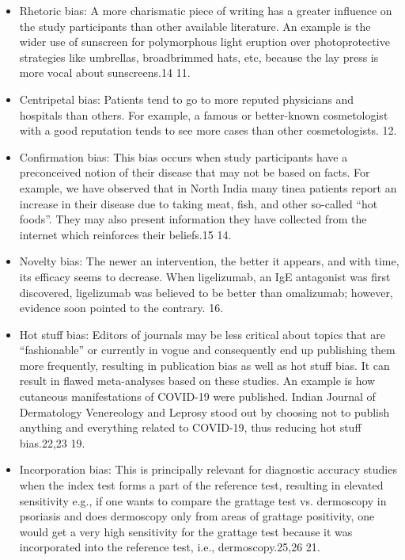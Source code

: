 \documentclass[12pt, a4paper, oneside]{book}   	%
\begin{document}
\begin{itemize}
				\item Rhetoric bias: A more charismatic piece of writing has a greater influence on the study participants than other available literature. An example is the wider use of sunscreen for polymorphous light eruption over photoprotective strategies like umbrellas, broadbrimmed hats, etc, because the lay press is more vocal about sunscreens.14 11. \autocite{Chakraborty_2023}
				\item Centripetal bias: Patients tend to go to more reputed physicians and hospitals than others. For example, a famous or better-known cosmetologist with a good reputation tends to see more cases than other cosmetologists. 12.\autocite{Chakraborty_2023}
				\item  Confirmation bias: This bias occurs when study participants have a preconceived notion of their disease that may not be based on facts. For example, we have observed that in North India many tinea patients report an increase in their disease due to taking meat, fish, and other so-called “hot foods”. They may also present information they have collected from the internet which reinforces their beliefs.15 14.\autocite{Chakraborty_2023}
				\item  Novelty bias: The newer an intervention, the better it appears, and with time, its efficacy seems to decrease. When ligelizumab, an IgE antagonist was first discovered, ligelizumab was believed to be better than omalizumab; however, evidence soon pointed to the contrary. 16.\autocite{Chakraborty_2023}
				\item 
				Hot stuff bias: Editors of journals may be less critical about topics that are “fashionable” or currently in vogue and consequently end up publishing them more frequently, resulting in publication bias as well as hot stuff bias. It can result in flawed meta-analyses based on these studies. An example is how cutaneous manifestations of COVID-19 were published. Indian Journal of Dermatology Venereology and Leprosy stood out by choosing not to publish anything and everything related to COVID-19, thus reducing hot stuff bias.22,23 19. \autocite{Chakraborty_2023}
				\item  Incorporation bias: This is principally relevant for diagnostic accuracy studies when the index test forms a part of the reference test, resulting in elevated sensitivity e.g., if one wants to compare the grattage test vs. dermoscopy in psoriasis and does dermoscopy only from areas of grattage positivity, one would get a very high sensitivity for the grattage test because it was incorporated into the reference test, i.e., dermoscopy.25,26 21.\autocite{Chakraborty_2023}

\end{itemize}
\end{document}
